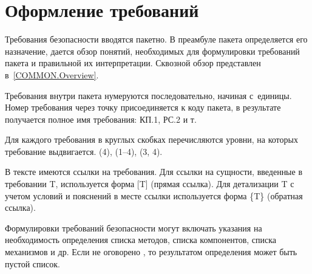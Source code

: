 \section{Оформление требований}\label{COMMON.Notation}

Требования безопасности вводятся пакетно. В преамбуле пакета определяется 
его назначение, дается обзор понятий, необходимых для формулировки 
требований пакета и правильной их интерпретации.
%
Сквозной обзор представлен в~\ref{COMMON.Overview}.

Требования внутри пакета нумеруются последовательно, начиная с~единицы.
%
Номер требования через точку присоединяется к коду пакета, 
в результате получается полное имя требования: КП.1, РС.2 и т.

Для каждого требования в круглых скобках перечисляются уровни, 
на которых требование выдвигается.
 (4), (1--4), (3, 4).

В тексте имеются ссылки на требования. 
%
Для ссылки на сущности, введенные в требовании T, используется 
форма [T] (прямая ссылка).
%
Для детализации T с учетом условий и пояснений в месте ссылки 
используется  форма \{T\} (обратная ссылка).

Формулировки требований безопасности могут включать указания на 
необходимость определения списка методов, списка компонентов, 
списка механизмов и др.
%
Если не оговорено , то результатом определения 
может быть пустой список.

